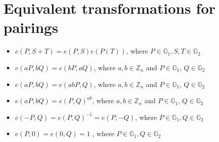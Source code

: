 \section{Equivalent transformations for pairings}
\label{sec:apx.equivtransform}

\begin{itemize}
	\item $e(P, S+T) = e(P,S) e(P(T))$, where $P \in \mathbb{G}_1, S,T \in \mathbb{G}_2$
	\item $e(aP, bQ) = e(bP, aQ)$,  where $a,b \in \mathbb{Z}_n$ and $P \in \mathbb{G}_1$, $Q \in \mathbb{G}_2$
	\item $e(aP, bQ) = e(abP,Q)$,  where $a,b \in \mathbb{Z}_n$ and $P \in \mathbb{G}_1$, $Q \in \mathbb{G}_2$
	\item $e(aP, bQ) = e(P,Q)^{ab}$,  where $a,b \in \mathbb{Z}_n$ and $P \in \mathbb{G}_1$, $Q \in \mathbb{G}_2$
	\item $e(-P, Q) = e(P,Q)^{-1} = e(P,-Q)$, where $P \in \mathbb{G}_1, Q \in \mathbb{G}_2$
	\item $e(P,0) = e(0, Q) = 1$ , where $P \in \mathbb{G}_1, Q \in \mathbb{G}_2$
\end{itemize}

